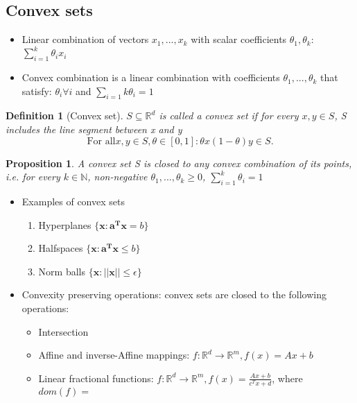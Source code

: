 \documentclass[11pt]{article}
\newtheorem{definition}[theorem]{Definition}
\newtheorem{proposition}[theorem]{Proposition}
\begin{document}
\subsection*{Convex sets}
\begin{itemize}
    \item Linear combination of vectors $x_1, ..., x_k$ with scalar coefficients $\theta_1, \theta_k $: $\sum_{i=1}^{k} \theta_i x_i$
    \item Convex combination is a linear combination with coefficients $\theta_1, ..., \theta_k$ that satisfy: $\theta_i \forall i$ and $\sum_{i=1}{k} \theta_i= 1 $   
\end{itemize}

\begin{definition}[Convex set] $S \subseteq \mathbb{R}^d$ is called a convex set if for every $x,y \in S$, S includes the line segment between x and y \[
\text{For all} x,y\in S, \theta \in[0,1]: \theta x (1-\theta)y \in S
.\]   
    
\end{definition}
  
\begin{proposition}
    A convex set S is closed to any convex combination of its points, i.e. for every $k\in \mathbb{N}$, non-negative $\theta_1, ..., \theta_k \geq 0$, $\sum_{i=1}^{k} \theta_i = 1$    
\end{proposition} %


\begin{itemize}
    \item Examples of convex sets \begin{enumerate}
        \item Hyperplanes $\{ \mathbf{x}: \mathbf{a^Tx} = b \}$
        \item Halfspaces $\{ \mathbf{x}: \mathbf{a^Tx} \leq b \}$
        \item Norm balls $\{ \mathbf{x}: \mathbf{||x||} \leq \epsilon \}$ 
    \end{enumerate}

    \item Convexity preserving operations: convex sets are closed to the following operations: \begin{itemize}
        \item Intersection
        \item Affine and inverse-Affine mappings: $f:\mathbb{R}^d \to \mathbb{R}^m, f(x) = Ax + b$ 
        \item Linear fractional functions: $f:\mathbb{R}^d \to \mathbb{R}^m, f(x) = \frac{Ax + b}{c^Tx +d}$, where $dom(f) =$ %
    \end{itemize}
    
\end{itemize}
\end{document}
